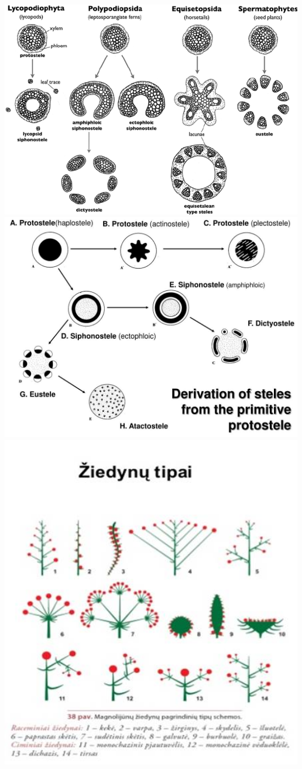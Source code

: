 \documentclass[]{book}
\begin{document}
\includegraphics[width=500px]{static/augalai/steles_1}
\includegraphics[width=500px]{static/augalai/steles_2}
\includegraphics[width=500px]{static/augalai/ziedynu_tipai}


\end{document}
